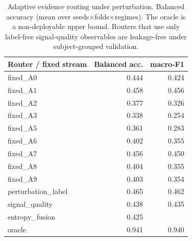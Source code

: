 \begin{table}[t]\centering\footnotesize
\caption{Adaptive evidence routing under perturbation. Balanced accuracy (mean over seeds$\times$folds$\times$regimes). The oracle is a non-deployable upper bound. Routers that use only label-free signal-quality observables are leakage-free under subject-grouped validation.}
\label{tab:adaptive_routing}
\begin{tabular}{l r r}
\toprule
Router / fixed stream & Balanced acc. & macro-F1 \\
\midrule
fixed\_A0 & 0.444 & 0.424 \\
fixed\_A1 & 0.458 & 0.456 \\
fixed\_A2 & 0.377 & 0.326 \\
fixed\_A3 & 0.338 & 0.254 \\
fixed\_A5 & 0.361 & 0.283 \\
fixed\_A6 & 0.402 & 0.355 \\
fixed\_A7 & 0.456 & 0.450 \\
fixed\_A8 & 0.404 & 0.355 \\
fixed\_A9 & 0.403 & 0.354 \\
\midrule
perturbation\_label & 0.465 & 0.462 \\
signal\_quality & 0.438 & 0.435 \\
entropy\_fusion & 0.425 &  \\
oracle & 0.941 & 0.940 \\
\bottomrule
\end{tabular}
\end{table}
